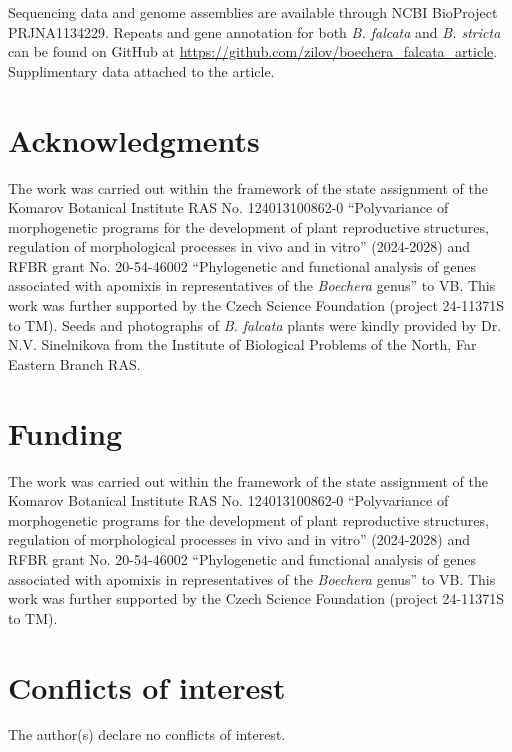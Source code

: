 \documentclass[9pt,twocolumn,twoside,lineno]{gsag3jnl}
\begin{document}
Sequencing data and genome assemblies are available through NCBI BioProject PRJNA1134229. Repeats and gene annotation for both \textit{B. falcata} and \textit{B. stricta} can be found on GitHub at \url{https://github.com/zilov/boechera_falcata_article}. Supplimentary data attached to the article.


\section{Acknowledgments}

The work was carried out within the framework of the state assignment of the Komarov Botanical Institute RAS No. 124013100862-0 “Polyvariance of morphogenetic programs for the development of plant reproductive structures, regulation of morphological processes in vivo and in vitro” (2024-2028) and RFBR grant No. 20-54-46002 “Phylogenetic and functional analysis of genes associated with apomixis in representatives of the \textit{Boechera} genus” to VB. This work was further supported by the Czech Science Foundation (project 24-11371S to TM). Seeds and photographs of \textit{B. falcata} plants were kindly provided by Dr. N.V. Sinelnikova from the Institute of Biological Problems of the North, Far Eastern Branch RAS.

\section{Funding}

The work was carried out within the framework of the state assignment of the Komarov Botanical Institute RAS No. 124013100862-0 “Polyvariance of morphogenetic programs for the development of plant reproductive structures, regulation of morphological processes in vivo and in vitro” (2024-2028) and RFBR grant No. 20-54-46002 “Phylogenetic and functional analysis of genes associated with apomixis in representatives of the \textit{Boechera} genus” to VB. This work was further supported by the Czech Science Foundation (project 24-11371S to TM).

\section{Conflicts of interest}
The author(s) declare no conflicts of interest.


\end{document}
